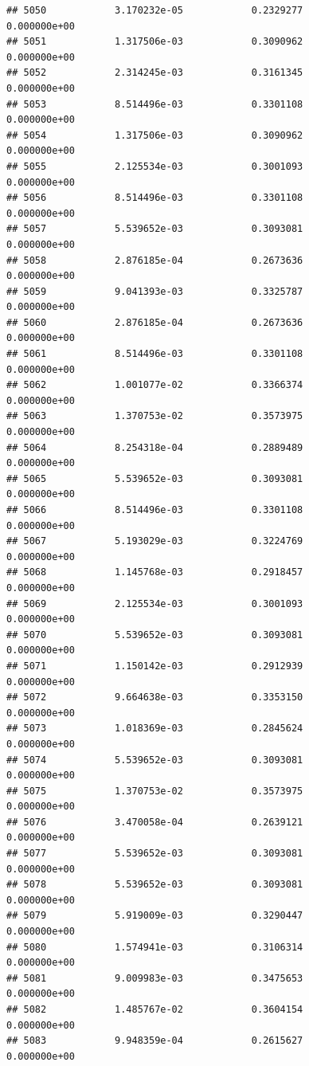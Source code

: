 \documentclass[
]{article}
\begin{document}
\begin{verbatim}
## 5050            3.170232e-05            0.2329277            0.000000e+00
## 5051            1.317506e-03            0.3090962            0.000000e+00
## 5052            2.314245e-03            0.3161345            0.000000e+00
## 5053            8.514496e-03            0.3301108            0.000000e+00
## 5054            1.317506e-03            0.3090962            0.000000e+00
## 5055            2.125534e-03            0.3001093            0.000000e+00
## 5056            8.514496e-03            0.3301108            0.000000e+00
## 5057            5.539652e-03            0.3093081            0.000000e+00
## 5058            2.876185e-04            0.2673636            0.000000e+00
## 5059            9.041393e-03            0.3325787            0.000000e+00
## 5060            2.876185e-04            0.2673636            0.000000e+00
## 5061            8.514496e-03            0.3301108            0.000000e+00
## 5062            1.001077e-02            0.3366374            0.000000e+00
## 5063            1.370753e-02            0.3573975            0.000000e+00
## 5064            8.254318e-04            0.2889489            0.000000e+00
## 5065            5.539652e-03            0.3093081            0.000000e+00
## 5066            8.514496e-03            0.3301108            0.000000e+00
## 5067            5.193029e-03            0.3224769            0.000000e+00
## 5068            1.145768e-03            0.2918457            0.000000e+00
## 5069            2.125534e-03            0.3001093            0.000000e+00
## 5070            5.539652e-03            0.3093081            0.000000e+00
## 5071            1.150142e-03            0.2912939            0.000000e+00
## 5072            9.664638e-03            0.3353150            0.000000e+00
## 5073            1.018369e-03            0.2845624            0.000000e+00
## 5074            5.539652e-03            0.3093081            0.000000e+00
## 5075            1.370753e-02            0.3573975            0.000000e+00
## 5076            3.470058e-04            0.2639121            0.000000e+00
## 5077            5.539652e-03            0.3093081            0.000000e+00
## 5078            5.539652e-03            0.3093081            0.000000e+00
## 5079            5.919009e-03            0.3290447            0.000000e+00
## 5080            1.574941e-03            0.3106314            0.000000e+00
## 5081            9.009983e-03            0.3475653            0.000000e+00
## 5082            1.485767e-02            0.3604154            0.000000e+00
## 5083            9.948359e-04            0.2615627            0.000000e+00

\end{verbatim}
\end{document}
